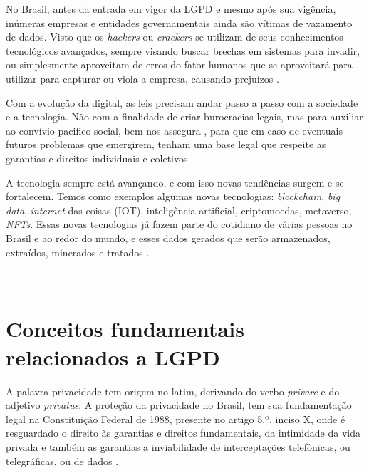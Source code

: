 \documentclass[
	12pt,				%
	openright,			%
	oneside,			%
	a4paper,			%
	english,			%
	french,				%
	spanish,			%
	brazil,				%
	]{abntex2}
\begin{document}
No Brasil, antes da entrada em vigor da LGPD e mesmo após sua vigência, inúmeras empresas e entidades governamentais ainda são vítimas de vazamento de dados. Visto que os \textit{hackers} ou \textit{crackers} se utilizam de seus conhecimentos tecnológicos avançados, sempre visando buscar brechas em sistemas para invadir, ou simplesmente aproveitam de erros do fator humanos que se aproveitará para utilizar para capturar ou viola a empresa, causando prejuízos \cite{02-01-Almeida2020}.

Com a evolução da digital, as leis precisam andar passo a passo com a sociedade e a tecnologia. Não com a finalidade de criar burocracias legais, mas para auxiliar ao convívio pacifico social, bem nos assegura , para que em caso de eventuais futuros problemas que emergirem, tenham uma base legal que respeite as garantias e direitos individuais e coletivos. 

A tecnologia sempre está avançando, e com isso novas tendências surgem e se fortalecem. Temos como exemplos algumas novas tecnologias: \textit{blockchain}, \textit{big data}, \textit{internet} das coisas (IOT), inteligência artificial, criptomoedas, metaverso, \textit{NFTs}. Essas novas tecnologias já fazem parte do cotidiano de várias pessoas no Brasil e ao redor do mundo, e esses dados gerados que serão armazenados, extraídos, minerados e tratados \cite{02-01-Vainzof2020}.
\\
\\
\\

\section{Conceitos fundamentais relacionados a LGPD }
A palavra privacidade tem origem no latim, derivando do verbo \textit{privare} e do adjetivo \textit{privatus}. A proteção da privacidade no Brasil, tem sua fundamentação legal na Constituição Federal de 1988, presente no artigo 5.º, inciso X, onde é resguardado o direito às garantias e direitos fundamentais, da intimidade da vida privada e também as garantias a inviabilidade de interceptações telefônicas, ou telegráficas, ou de dados \cite{Doneda2020}.

\end{document}
